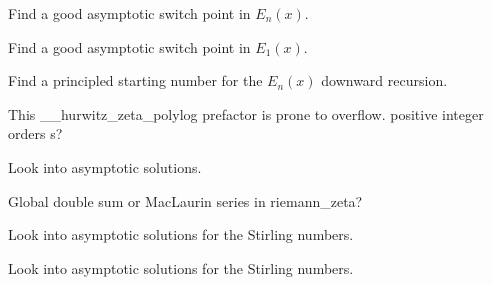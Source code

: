 \begin{DoxyRefList}
Find a good asymptotic switch point in $ E_n(x) $.  
\item[\label{todo__todo000006}%
\hypertarget{todo__todo000006}{}%
Member \hyperlink{namespacestd_1_1____detail_a665eb0c524b929c035d88bbb17815917}{std\+:\+:\+\_\+\+\_\+detail\+:\+:\+\_\+\+\_\+expint\+\_\+\+E1} (\+\_\+\+Tp \+\_\+\+\_\+x)]Find a good asymptotic switch point in $ E_1(x) $.  
\item[\label{todo__todo000005}%
\hypertarget{todo__todo000005}{}%
Member \hyperlink{namespacestd_1_1____detail_a9b0a2050324390fb6c4a584170289a99}{std\+:\+:\+\_\+\+\_\+detail\+:\+:\+\_\+\+\_\+expint\+\_\+\+En\+\_\+recursion} (unsigned int \+\_\+\+\_\+n, \+\_\+\+Tp \+\_\+\+\_\+x)]Find a principled starting number for the $ E_n(x) $ downward recursion.  
\item[\label{todo__todo000009}%
\hypertarget{todo__todo000009}{}%
Member \hyperlink{namespacestd_1_1____detail_a7c45415c3ec0e137eea2364a6dd3af4e}{std\+:\+:\+\_\+\+\_\+detail\+:\+:\+\_\+\+\_\+hurwitz\+\_\+zeta\+\_\+polylog} (\+\_\+\+Tp \+\_\+\+\_\+s, std\+::complex$<$ \+\_\+\+Tp $>$ \+\_\+\+\_\+a)]This \+\_\+\+\_\+hurwitz\+\_\+zeta\+\_\+polylog prefactor is prone to overflow. positive integer orders s?  
\item[\label{todo__todo000012}%
\hypertarget{todo__todo000012}{}%
Member \hyperlink{namespacestd_1_1____detail_a7ba1fde0547236676d579b6405f2fb25}{std\+:\+:\+\_\+\+\_\+detail\+:\+:\+\_\+\+\_\+log\+\_\+stirling\+\_\+2} (unsigned int \+\_\+\+\_\+n, unsigned int \+\_\+\+\_\+m)]Look into asymptotic solutions.  
\item[\label{todo__todo000014}%
\hypertarget{todo__todo000014}{}%
Member \hyperlink{namespacestd_1_1____detail_a2be77d9bdd1b8b463be44a0e7558bc2a}{std\+:\+:\+\_\+\+\_\+detail\+:\+:\+\_\+\+\_\+riemann\+\_\+zeta} (\+\_\+\+Tp \+\_\+\+\_\+s)]Global double sum or Mac\+Laurin series in riemann\+\_\+zeta?  
\item[\label{todo__todo000013}%
\hypertarget{todo__todo000013}{}%
Member \hyperlink{namespacestd_1_1____detail_a8b215e4ca28ec9b7b078d7f3d9aecc17}{std\+:\+:\+\_\+\+\_\+detail\+:\+:\+\_\+\+\_\+stirling\+\_\+1} (unsigned int \+\_\+\+\_\+n, unsigned int \+\_\+\+\_\+m)]Look into asymptotic solutions for the Stirling numbers.  
\item[\label{todo__todo000011}%
\hypertarget{todo__todo000011}{}%
Member \hyperlink{namespacestd_1_1____detail_a4589d459a7a9d1d9e19b33601238a4af}{std\+:\+:\+\_\+\+\_\+detail\+:\+:\+\_\+\+\_\+stirling\+\_\+2} (unsigned int \+\_\+\+\_\+n, unsigned int \+\_\+\+\_\+m)]Look into asymptotic solutions for the Stirling numbers.  

\end{DoxyRefList}
